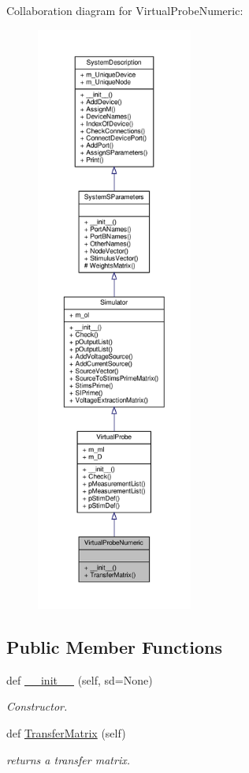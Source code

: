 Collaboration diagram for Virtual\+Probe\+Numeric\+:
\nopagebreak
\begin{figure}[H]
\begin{center}
\leavevmode
\includegraphics[height=550pt]{classSignalIntegrity_1_1SystemDescriptions_1_1VirtualProbeNumeric_1_1VirtualProbeNumeric__coll__graph}
\end{center}
\end{figure}
\subsection*{Public Member Functions}
\begin{DoxyCompactItemize}
\item 
def \hyperlink{classSignalIntegrity_1_1SystemDescriptions_1_1VirtualProbeNumeric_1_1VirtualProbeNumeric_a2fa2ae61a4511a760e2d2047ec07eb05}{\+\_\+\+\_\+init\+\_\+\+\_\+} (self, sd=None)
\begin{DoxyCompactList}\small\item\em Constructor. \end{DoxyCompactList}\item 
def \hyperlink{classSignalIntegrity_1_1SystemDescriptions_1_1VirtualProbeNumeric_1_1VirtualProbeNumeric_aecf838369a0d4e9037ba351539bd8eb1}{Transfer\+Matrix} (self)
\begin{DoxyCompactList}\small\item\em returns a transfer matrix. \end{DoxyCompactList}\end{DoxyCompactItemize}
